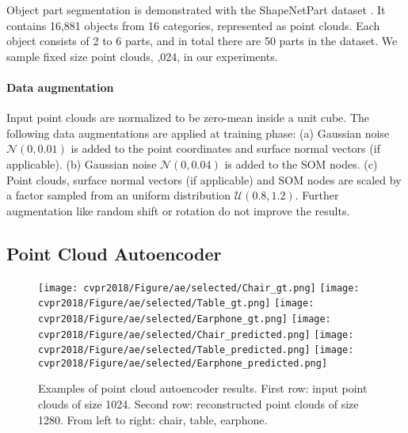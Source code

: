 \documentclass[10pt,twocolumn,letterpaper]{article}
\begin{document}
Object part segmentation is demonstrated with the ShapeNetPart dataset \cite{yi2016scalable}. It contains 16,881 objects from 16 categories, represented as point clouds. Each object consists of 2 to 6 parts, and in total there are 50 parts in the dataset. We sample fixed size point clouds, ,024, in our experiments.

\paragraph{Data augmentation}
Input point clouds are normalized to be zero-mean inside a unit cube. The following data augmentations are applied at training phase: (a) Gaussian noise $\mathcal{N}(0, 0.01)$ is added to the point coordinates and surface normal vectors (if applicable). (b) Gaussian noise $\mathcal{N}(0, 0.04)$ is added to the SOM nodes. (c) Point clouds, surface normal vectors (if applicable) and SOM nodes are scaled by a factor sampled from an uniform distribution $\mathcal{U}(0.8, 1.2)$. Further augmentation like random shift or rotation do not improve the results.

\subsection{Point Cloud Autoencoder} \label{sec_exp_ae}
\begin{figure}[h]
        \centering
        \texttt{[image: cvpr2018/Figure/ae/selected/Chair\_gt.png]}
        \texttt{[image: cvpr2018/Figure/ae/selected/Table\_gt.png]}
        \texttt{[image: cvpr2018/Figure/ae/selected/Earphone\_gt.png]}
        \texttt{[image: cvpr2018/Figure/ae/selected/Chair\_predicted.png]}
        \texttt{[image: cvpr2018/Figure/ae/selected/Table\_predicted.png]}
        \texttt{[image: cvpr2018/Figure/ae/selected/Earphone\_predicted.png]}
        \caption{Examples of point cloud autoencoder results. First row: input point clouds of size 1024. Second row: reconstructed point clouds of size 1280. From left to right: chair, table, earphone.}
        \label{fig_ae_selected}
        \vspace{-4pt}
\end{figure}
\end{document}
